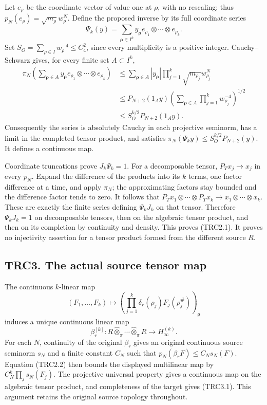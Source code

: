 Let \(e_\rho\) be the coordinate vector of value one at \(\rho\), with
no rescaling; thus \(p_N(e_\rho)=\sqrt{m_\rho}w_\rho^N\). Define the
proposed inverse by its full coordinate series \[
\Psi_k(y)=\sum_{\boldsymbol\rho\in I^k}
y_{\boldsymbol\rho}
e_{\rho_1}\otimes\cdots\otimes e_{\rho_k}.
\tag{TRC2.3}
\] Set \(S_O=\sum_{\rho\in I}w_\rho^{-4}\le C_4^2\), since every
multiplicity is a positive integer. Cauchy--Schwarz gives, for every
finite set \(A\subset I^k\), \[
\begin{aligned}
\pi_N\!\left(\sum_{\boldsymbol\rho\in A}
y_{\boldsymbol\rho}e_{\rho_1}\otimes\cdots\otimes e_{\rho_k}\right)
&\le\sum_{\boldsymbol\rho\in A}|y_{\boldsymbol\rho}|
\prod_{j=1}^k\sqrt{m_{\rho_j}}w_{\rho_j}^N\\
&\le P_{N+2}(1_Ay)
\left(\sum_{\boldsymbol\rho\in A}\prod_{j=1}^kw_{\rho_j}^{-4}\right)^{1/2}\\
&\le S_O^{k/2}P_{N+2}(1_Ay).
\end{aligned}
\tag{TRC2.4}
\] Consequently the series is absolutely Cauchy in each projective
seminorm, has a limit in the completed tensor product, and satisfies
\(\pi_N(\Psi_ky)\le S_O^{k/2}P_{N+2}(y)\). It defines a continuous map.

Coordinate truncations prove \(J_k\Psi_k=1\). For a decomposable tensor,
\(P_Tx_j\to x_j\) in every \(p_N\). Expand the difference of the
products into its \(k\) terms, one factor difference at a time, and
apply \(\pi_N\); the approximating factors stay bounded and the
difference factor tends to zero. It follows that
\(P_Tx_1\otimes\cdots\otimes P_Tx_k\to x_1\otimes\cdots\otimes x_k\).
These are exactly the finite series defining \(\Psi_kJ_k\) on that
tensor. Therefore \(\Psi_kJ_k=1\) on decomposable tensors, then on the
algebraic tensor product, and then on its completion by continuity and
density. This proves (TRC2.1). It proves no injectivity assertion for a
tensor product formed from the different source \(R\).

\subsection{TRC3. The actual source tensor
map}\label{trc3.-the-actual-source-tensor-map}

The continuous \(k\)-linear map \[
(F_1,\ldots,F_k)\longmapsto
\left(\prod_{j=1}^k\delta_r(\rho_j)F_j(\rho_j^\#)\right)_{\boldsymbol\rho}
\] induces a unique continuous linear map \[
\beta_r^{[k]}:R\widehat\otimes_\pi\cdots\widehat\otimes_\pi R
\longrightarrow H_\infty^{(k)}.
\tag{TRC3.1}
\] For each \(N\), continuity of the original \(\beta_r\) gives an
original continuous source seminorm \(s_N\) and a finite constant
\(C_N\) such that \(p_N(\beta_rF)\le C_Ns_N(F)\). Equation (TRC2.2) then
bounds the displayed multilinear map by \(C_N^k\prod_js_N(F_j)\). The
projective universal property gives a continuous map on the algebraic
tensor product, and completeness of the target gives (TRC3.1). This
argument retains the original source topology throughout.

